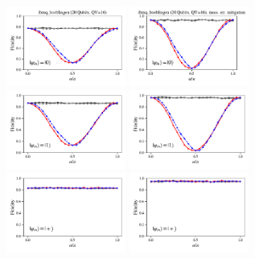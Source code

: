 \documentclass[a4paper]{article}
\begin{document}
\begin{figure}[H]
	\centering
	\includegraphics[width=0.35\textwidth]{fidelity_qc3_mit1_state0}
	\includegraphics[width=0.35\textwidth]{fidelity_qc3_mit0_state0}
	\\
	\includegraphics[width=0.35\textwidth]{fidelity_qc3_mit1_state1}
	\includegraphics[width=0.35\textwidth]{fidelity_qc3_mit0_state1}
	\\
	\includegraphics[width=0.35\textwidth]{fidelity_qc3_mit1_state2}
	\includegraphics[width=0.35\textwidth]{fidelity_qc3_mit0_state2}

\end{figure}
\end{document}
